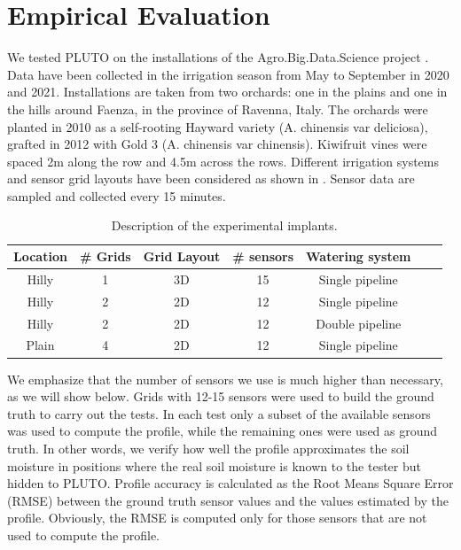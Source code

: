 \section{Empirical Evaluation}
\label{pluto-sec:ResultsAndDiscussion}
We tested PLUTO on the installations of the Agro.Big.Data.Science project \cite{ABDS}.
Data have been collected in the irrigation season from May to September in 2020 and 2021.
Installations are taken from two orchards: one in the plains and one in the hills around Faenza, in the province of Ravenna, Italy.
The orchards were planted in 2010 as a self-rooting Hayward variety (A. chinensis var deliciosa), grafted in 2012 with Gold 3 (A. chinensis var chinensis). 
Kiwifruit vines were spaced 2m along the row and 4.5m across the rows.
Different irrigation systems and sensor grid layouts have been considered as shown in .
Sensor data are sampled and collected every 15 minutes. 
\begin{table}[t]
\centering
\begin{tabular}{@{}ccccccc@{}}
\toprule
Location & \# Grids & Grid Layout & \# sensors & Watering system \\ \midrule
Hilly & 1 & 3D & 15 & Single pipeline \\
Hilly & 2 & 2D & 12 & Single pipeline \\
Hilly & 2 & 2D & 12 & Double pipeline \\
Plain & 4 & 2D & 12 & Single pipeline \\ \bottomrule
\end{tabular}
\caption{Description of the experimental implants.}\label{pluto-tbl:implants}
\end{table}

We emphasize that the number of sensors we use is much higher than necessary, as we will show below. 
Grids with 12-15 sensors were used to build the ground truth to carry out the tests. In each test only a subset of the available sensors was used to compute the profile, while the remaining ones were used as ground truth. In other words, we verify how well the profile approximates the soil moisture in positions where the real soil moisture is known to the tester but hidden to PLUTO. Profile accuracy is calculated as the Root Means Square Error (RMSE) between the ground truth sensor values and the values estimated by the profile. Obviously, the RMSE is computed only for those sensors that are not used to compute the profile.

